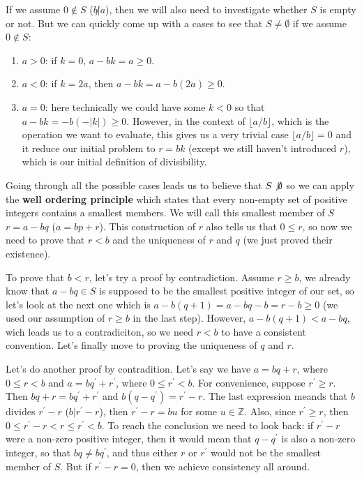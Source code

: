 If we assume $0\notin S$ ($b\not| a$), then we will also need to investigate whether $S$ is empty or not.
But we can quickly come up with a cases to see that $S \neq \emptyset$ if we assume $0\notin S$:
\begin{enumerate}
    \item $a>0$: if $k=0$, $a - bk = a\geq 0$.
    \item $a<0$: if $k = 2a$, then $a - bk = a - b(2a) \geq 0$.
    \item $a=0$: here technically we could have some $k<0$ so that $a - bk = -b(-|k|) \geq 0$. However,
    in the context of $\lfloor a/b \rfloor$, which is the operation we want to evaluate, this gives us a very
    trivial case $\lfloor a/b \rfloor = 0$ and it reduce our initial problem to $r = bk$ (except we still haven't
    introduced $r$), which is our initial definition of divisibility.
\end{enumerate}
Going through all the possible cases leads us to believe that $S\not \emptyset$
so we can apply the \textbf{well ordering principle} which states that every non-empty set of positive
integers contains a smallest members.
We will call this smallest member of $S$ $r = a - bq$ ($a = bp + r$).
This construction of $r$ also tells us that $0 \leq r$, so now we need to prove that $r < b$ and the
uniqueness of $r$ and $q$ (we just proved their existence).

To prove that $b < r$, let's try a proof by contradiction.
Assume $r \geq b$, we already know that $a - bq \in S$ is supposed to be the smallest positive integer of our set,
so let's look at the next one which is $a - b(q+1) = a - bq - b = r - b \geq 0$ (we used our assumption of
$r \geq b$ in the last step).
However, $a - b(q+1) < a - bq$, wich leads us to a contradiciton, so we need $r < b$ to have a consistent
convention.
Let's finally move to proving the uniqueness of $q$ and $r$.

Let's do another proof by contradition.
Let's say we have $a = bq + r$, where $0 \leq r < b$ and $a = bq^\prime + r^\prime$, where $0 \leq r^\prime < b$.
For convenience, suppose $r^\prime \geq r$.
Then $bq + r = bq^\prime + r^\prime$ and $b(q - q^\prime) = r^\prime -r$.
The last expression meands that $b$ divides $r^\prime - r$ ($b | r^\prime-r$), then $r^\prime-r = bu$ for some $u\in\mathbb{Z}$.
Also, since $r^\prime \geq r$, then $0 \leq r^\prime - r < r \leq r^\prime < b$.
To reach the conclusion we need to look back: if $r^\prime - r$ were a non-zero positive integer, then it would mean
that $q - q^\prime$ is also a non-zero integer, so that $bq \neq bq^\prime$, and thus either $r$ or $r^\prime$ would not be the
smallest member of $S$. But if $r^\prime - r = 0$, then we achieve consistency all around.




